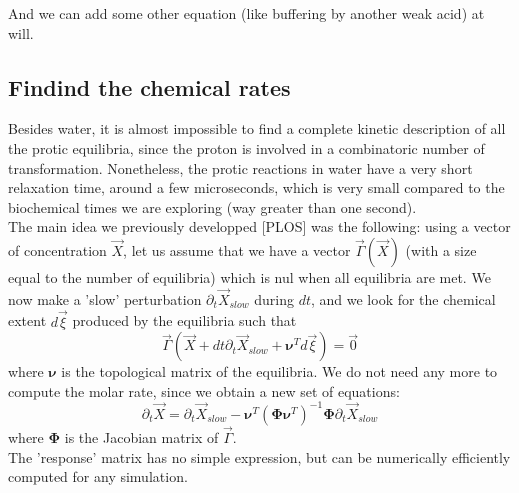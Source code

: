 \documentclass{revtex4}
\begin{document}
And we can add some other equation (like buffering by another weak acid) at will.

\subsection{Findind the chemical rates}
Besides water, it is almost impossible to find a complete kinetic description of all the protic equilibria, since
the proton is involved in a combinatoric number of transformation. Nonetheless, the protic
reactions in water have a very short relaxation time, around a few microseconds, which is very small compared to
the biochemical times we are exploring (way greater than one second).\\
The main idea we previously developped [PLOS] was the following: using a vector of concentration $\vec{X}$, let us assume that we
have a vector $\vec{\Gamma}\left(\vec{X}\right)$ (with a size equal to the number of equilibria) which is nul when all equilibria are met. We now make a 'slow' perturbation $\partial_t \vec{X}_{slow}$ during $dt$, and we look for the chemical extent $d\vec{\xi}$
produced by the equilibria such that
\begin{equation}
		\vec{\Gamma}\left(\vec{X}+dt\partial_t\vec{X}_{slow} + \boldsymbol{\nu}^T d\vec{\xi}\right) = \vec{0}
\end{equation}
where $\boldsymbol{\nu}$ is the topological matrix of the equilibria.
We do not need any more to compute the molar rate, since we obtain a new set of equations:
\begin{equation}
	\partial_t\vec{X} = \partial_t\vec{X}_{slow} - \boldsymbol{\nu}^T\left(\boldsymbol{\Phi}\boldsymbol{\nu}^T\right)^{-1}
	\boldsymbol{\Phi} \partial_t\vec{X}_{slow}
\end{equation}
where $\boldsymbol{\Phi}$ is the Jacobian matrix of $\vec{\Gamma}$.\\
The 'response' matrix has no simple expression, but can be numerically efficiently computed for any simulation.
\end{document}
